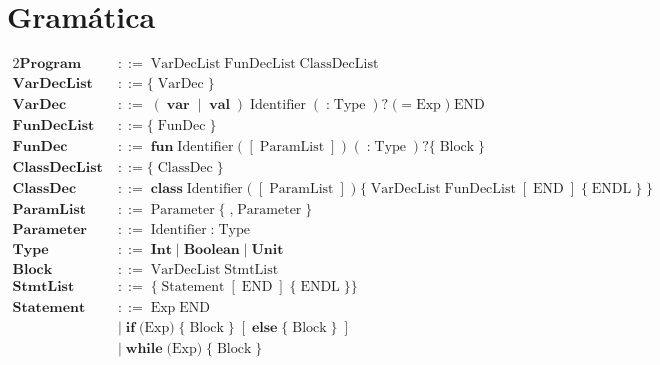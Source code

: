 \documentclass[a4paper,10pt]{article}
\begin{document}
\section*{Gramática}

\begin{alignat*}{2}
\textbf{Program}
  \;&::=  \; \text{VarDecList} 
    \; \text{FunDecList} 
    \;\text{ClassDecList}  \\[3pt]
\textbf{VarDecList}
\;&::= \{ \; \text{VarDec}\; \} \\[3pt]
\textbf{VarDec}
  \;&::=\; (\;\textbf{var}\;\mid\;\textbf{val}\;)\;\text{Identifier}
     \;(\;\textbf{:}\;\text{Type}\;)?
     \; \text{(} \; \textbf{=}\;\text{Exp} \; \text{)} \;\text{END} \\[3pt]
\textbf{FunDecList}
\;&::= \{ \; \text{FunDec}\; \} \\[3pt]
\textbf{FunDec}
  \;&::=\; \textbf{fun}\;\text{Identifier}
     \;\textbf{(}\;[\;\text{ParamList}\;]\;\textbf{)}
     \;(\;\textbf{:}\;\text{Type}\;)?
     \{ \;\text{Block}\; \} \\[3pt]
\textbf{ClassDecList}
\;&::= \{ \; \text{ClassDec}\; \} \\[3pt]
\textbf{ClassDec}
  \;&::=\; \textbf{class}\;\text{Identifier}
  \;\textbf{(}\;[\;\text{ParamList}\;]\;\textbf{)}
     \;\textbf{\{}\;\text{VarDecList} \; \text{FunDecList}\;[\;\text{END}\;]\;\{\;\text{ENDL}\;\}\;\textbf{\}} \\[3pt]
\textbf{ParamList}
  \;&::=\; \text{Parameter} \; \{ \; \textbf{,} \; \text{Parameter} \;\} \\[3pt]
\textbf{Parameter}
  \;&::=\; \text{Identifier}\;\textbf{:}\;\text{Type} \\[3pt]
\textbf{Type}
  \;&::=\; \textbf{Int}
   \;|\;\textbf{Boolean}
   \;|\;\textbf{Unit} \\[3pt]
\textbf{Block}
  \;&::=\; \text{VarDecList}  \; \text{StmtList} \; \\[3pt]
\textbf{StmtList}
  \;&::=\; \{\;\text{Statement}\;[\;\text{END}\;]\;\{\;\text{ENDL}\;\}\} \\[3pt]
\textbf{Statement}
\;&::=\;  \text{Exp}\;\text{END} \\
  \;&\mid\; \textbf{if}\;\textbf{(} \text{Exp} \textbf{)}\; \{ \; \text{Block} \; \}
     \;[\;\textbf{else} \; \{  \;\text{Block} \; \} \;] \\[3pt]
  \;&\mid\; \textbf{while}\;\textbf{(} \text{Exp} \textbf{)}\; \{ \; \text{Block}\; \} \\[3pt]

\end{alignat*}
\end{document}
